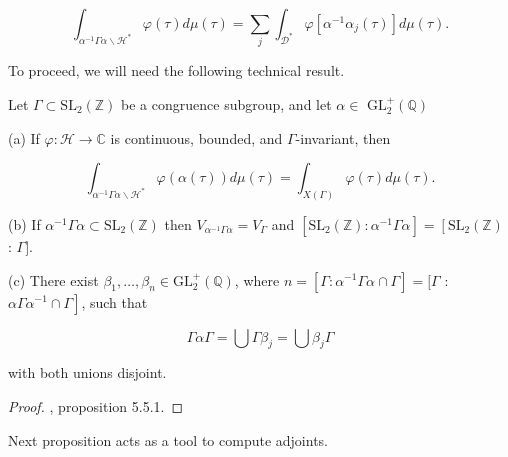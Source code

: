 $$
\int_{\alpha^{-1} \Gamma \alpha \backslash \mathcal{H}^{*}} \varphi(\tau) d \mu(\tau)=\sum_{j} \int_{\mathcal{D}^{*}} \varphi\left[\alpha^{-1} \alpha_{j}(\tau)\right] d \mu(\tau) .
$$

To proceed, we will need the following technical result.

\begin{lemma}
Let $\Gamma \subset \mathrm{SL}_{2}(\mathbb{Z})$ be a congruence subgroup, and let $\alpha \in$ $\mathrm{GL}_{2}^{+}(\mathbb{Q})$

(a) If $\varphi: \mathcal{H} \longrightarrow \mathbb{C}$ is continuous, bounded, and $\Gamma$-invariant, then

$$
\int_{\alpha^{-1} \Gamma \alpha \backslash \mathcal{H}^{*}} \varphi(\alpha(\tau)) d \mu(\tau)=\int_{X(\Gamma)} \varphi(\tau) d \mu(\tau) .
$$

(b) If $\alpha^{-1} \Gamma \alpha \subset \mathrm{SL}_{2}(\mathbb{Z})$ then $V_{\alpha^{-1} \Gamma \alpha}=V_{\Gamma}$ and $\left[\mathrm{SL}_{2}(\mathbb{Z}): \alpha^{-1} \Gamma \alpha\right]=\left[\mathrm{SL}_{2}(\mathbb{Z})\right.$ : $\Gamma]$.

(c) There exist $\beta_{1}, \ldots, \beta_{n} \in \mathrm{GL}_{2}^{+}(\mathbb{Q})$, where $n=\left[\Gamma: \alpha^{-1} \Gamma \alpha \cap \Gamma\right]=[\Gamma$ : $\left.\alpha \Gamma \alpha^{-1} \cap \Gamma\right]$, such that

$$
\Gamma \alpha \Gamma=\bigcup \Gamma \beta_{j}=\bigcup \beta_{j} \Gamma
$$

with both unions disjoint.

\end{lemma}

\begin{proof}
    \cite{diamond2005first}, proposition 5.5.1.
\end{proof}
Next proposition acts as a tool to compute adjoints. 

